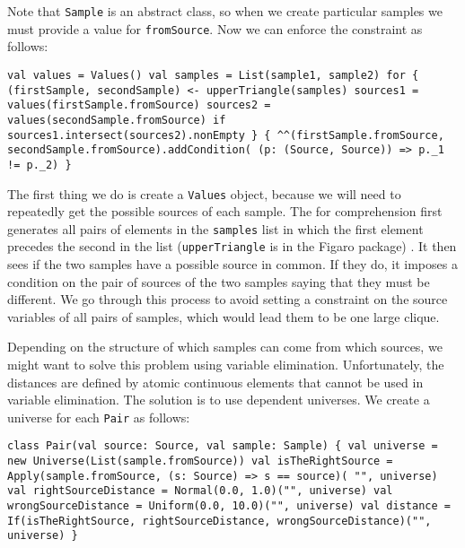 Note that \texttt{Sample} is an abstract class, so when we create particular samples we must provide a value for \texttt{fromSource}. Now we can enforce the constraint as follows:

\begin{flushleft}
\texttt{val values = Values()
\newline val samples = List(sample1, sample2)
\newline for \{
\newline \tab (firstSample, secondSample) <- upperTriangle(samples)
\newline \tab sources1 = values(firstSample.fromSource) 
\newline \tab sources2 = values(secondSample.fromSource) 
\newline if sources1.intersect(sources2).nonEmpty
\newline \} \{
\newline \tab \textasciicircum\textasciicircum(firstSample.fromSource, secondSample.fromSource).addCondition( (p: (Source, Source)) => p.\_1 != p.\_2)
\newline \}
}
\end{flushleft}

The first thing we do is create a \texttt{Values} object, because we will need to repeatedly get the possible sources of each sample. The for comprehension first generates all pairs of elements in the \texttt{samples} list in which the first element precedes the second in the list (\texttt{upperTriangle} is in the Figaro package) . It then sees if the two samples have a possible source in common. If they do, it imposes a condition on the pair of sources of the two samples saying that they must be different. We go through this process to avoid setting a constraint on the source variables of all pairs of samples, which would lead them to be one large clique.

Depending on the structure of which samples can come from which sources, we might want to solve this problem using variable elimination. Unfortunately, the distances are defined by atomic continuous elements that cannot be used in variable elimination. The solution is to use dependent universes. We create a universe for each \texttt{Pair} as follows:

\begin{flushleft}
\texttt{class Pair(val source: Source, val sample: Sample) \{ 
\newline \tab val universe = new Universe(List(sample.fromSource)) 
\newline \tab val isTheRightSource =
\newline \tab Apply(sample.fromSource, (s: Source) => s == source)( "", universe)
\newline \tab val rightSourceDistance = Normal(0.0, 1.0)("", universe)
\newline \tab val wrongSourceDistance = Uniform(0.0, 10.0)("", universe)
\newline \tab val distance =
\newline \tab If(isTheRightSource, rightSourceDistance, wrongSourceDistance)("", universe)
\newline \} }
\end{flushleft}

